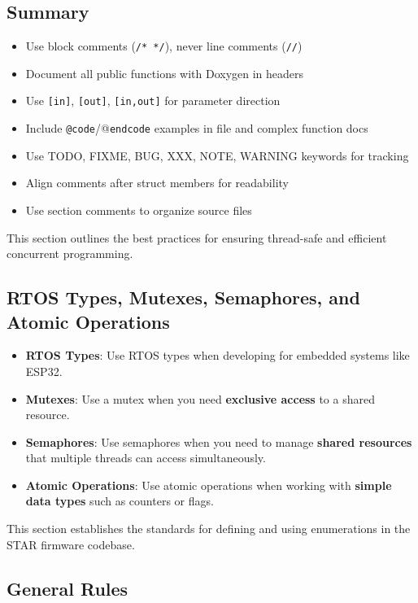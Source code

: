 \subsection{Summary}

\begin{itemize}
    \item Use block comments (\texttt{/* */}), never line comments (\texttt{//})
    \item Document all public functions with Doxygen in headers
    \item Use \texttt{[in]}, \texttt{[out]}, \texttt{[in,out]} for parameter direction
    \item Include \texttt{@code}/@\texttt{endcode} examples in file and complex function docs
    \item Use TODO, FIXME, BUG, XXX, NOTE, WARNING keywords for tracking
    \item Align comments after struct members for readability
    \item Use section comments to organize source files
\end{itemize}


This section outlines the best practices for ensuring thread-safe and efficient concurrent programming.

\subsection{RTOS Types, Mutexes, Semaphores, and Atomic Operations}
\begin{itemize}
    \item \textbf{RTOS Types}: Use RTOS types when developing for embedded systems like ESP32.
    \item \textbf{Mutexes}: Use a mutex when you need \textbf{exclusive access} to a shared resource.
    \item \textbf{Semaphores}: Use semaphores when you need to manage \textbf{shared resources} that multiple threads can access simultaneously.
    \item \textbf{Atomic Operations}: Use atomic operations when working with \textbf{simple data types} such as counters or flags.
\end{itemize}



This section establishes the standards for defining and using enumerations in the STAR firmware codebase.

\subsection{General Rules}

